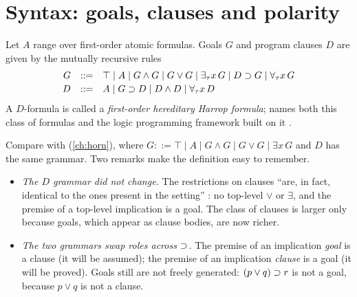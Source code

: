 \section{Syntax: goals, clauses and polarity}\label{sec:hh-syntax}

\begin{definition}\label{def:hh-grammar}
Let $A$ range over first-order atomic formulas. Goals $G$ and program clauses $D$ are given by the
mutually recursive rules
\[
\begin{array}{rcl}
G &::=& \top \mid A \mid G\wedge G \mid G\vee G \mid \exists_\tau x\,G \mid D\supset G \mid \forall_\tau x\,G\\[2pt]
D &::=& A \mid G\supset D \mid D\wedge D \mid \forall_\tau x\,D
\end{array}
\]
A $D$-formula is called a \emph{first-order hereditary Harrop formula}; \fohh{} names both this class
of formulas and the logic programming framework built on it .
\end{definition}

Compare with \fohc{} (\cref{ch:horn}), where $G::=\top\mid A\mid G\wedge G\mid G\vee G\mid\exists x\,G$
and $D$ has the same grammar. Two remarks make the definition easy to remember.
\begin{itemize}
  \item \emph{The $D$ grammar did not change.} The restrictions on clauses ``are, in fact, identical to
        the ones present in the \fohc{} setting'' : no top-level $\vee$ or $\exists$, and the
        premise of a top-level implication is a goal. The class of clauses is larger only because goals,
        which appear as clause bodies, are now richer.
  \item \emph{The two grammars swap roles across $\supset$.} The premise of an implication \emph{goal} is a
        clause (it will be assumed); the premise of an implication \emph{clause} is a goal (it will be
        proved). Goals still are not freely generated: $(p\vee q)\supset r$ is not a goal, because
        $p\vee q$ is not a clause.
\end{itemize}

